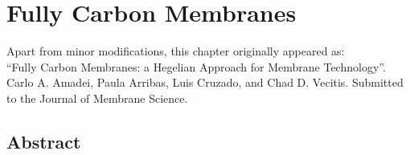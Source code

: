 \chapter{Fully Carbon Membranes}
\thispagestyle{plain}
\vspace{-.5cm}

\noindent Apart from minor modifications, this chapter originally appeared as:\newline\\
\ssp ``Fully Carbon Membranes: a Hegelian Approach for Membrane Technology''.
Carlo A. Amadei, Paula Arribas, Luis Cruzado, and Chad D. Vecitis. Submitted to the Journal of Membrane Science.

\section*{Abstract}
    \dsp
    


